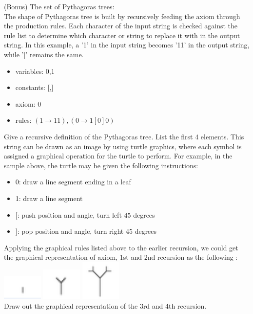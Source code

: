 \documentclass[solution, letterpaper]{cs20inclass}
\begin{document}
\begin{solution}
\end{solution}

\problem (Bonus) The set of Pythagoras trees:\\
The shape of Pythagoras tree is built by recursively feeding the axiom through the production rules. Each character of the input string is checked against the rule list to determine which character or string to replace it with in the output string. In this example, a '1' in the input string becomes '11' in the output string, while '[' remains the same. 
\begin{itemize}
\item variables: 0,1
\item constants: [,]
\item axiom: 0
\item rules: $(1\rightarrow 11), (0\rightarrow 1[0]0)$
\end{itemize}
\subproblem Give a recursive definition of the  Pythagoras tree.
\subproblem List the first 4 elements.
\subproblem This string can be drawn as an image by using turtle graphics, where each symbol is assigned a graphical operation for the turtle to perform. For example, in the sample above, the turtle may be given the following instructions:
\begin{itemize}
\item 0: draw a line segment ending in a leaf
\item 1: draw a line segment
\item $[$: push position and angle, turn left 45 degrees
\item $]$: pop position and angle, turn right 45 degrees
\end{itemize}
Applying the graphical rules listed above to the earlier recursion, we could get the graphical representation of axiom, 1st and 2nd recursion as the following :\\
\includegraphics[width=2cm]{0} 
\includegraphics[width=2cm]{1}
\includegraphics[width=2cm]{2}\\
Draw out the graphical representation of the 3rd and 4th recursion.

\begin{solution}
\end{solution}
\end{document}

